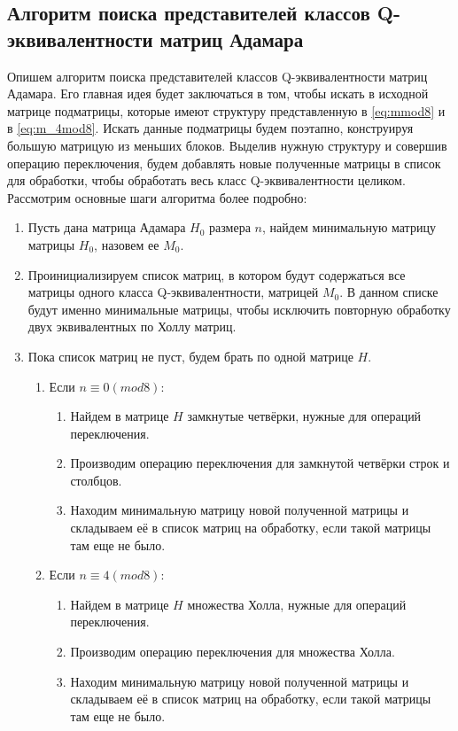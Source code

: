 \documentclass[a4paper, 14pt]{extreport}
\begin{document}
\subsection{Алгоритм поиска представителей классов Q-эквивалентности матриц Адамара}

Опишем алгоритм поиска представителей классов Q-эквивалентности матриц Адамара. Его главная идея будет заключаться в том, чтобы искать в исходной матрице подматрицы, которые имеют структуру представленную в \ref{eq:mmod8} и в \ref{eq:m_4mod8}. Искать данные подматрицы будем поэтапно, конструируя большую матрицую из меньших блоков. Выделив нужную структуру и совершив операцию переключения, будем добавлять новые полученные матрицы в список для обработки, чтобы обработать весь класс Q-эквивалентности целиком. Рассмотрим основные шаги алгоритма более подробно:
\begin{enumerate}
    \item Пусть дана матрица Адамара $H_0$ размера $n$, найдем минимальную матрицу матрицы $H_0$, назовем ее $M_0$.
    \item Проинициализируем список матриц, в котором будут содержаться все матрицы одного класса Q-эквивалентности, матрицей $M_0$. В данном списке будут именно минимальные матрицы, чтобы исключить повторную обработку двух эквивалентных по Холлу матриц.
    \item Пока список матриц не пуст, будем брать по одной матрице $H$.
    \begin{enumerate}[label*=\arabic*.]
        \item Если $n \equiv 0(mod8)$:
        \begin{enumerate}[label*=\arabic*.]
            \item Найдем в матрице $H$ замкнутые четвёрки, нужные для операций переключения.
            \item Производим операцию переключения для замкнутой четвёрки строк и столбцов.
            \item Находим минимальную матрицу новой полученной матрицы и складываем её в список матриц на обработку, если такой матрицы там еще не было.
        \end{enumerate}
        \item Если $n \equiv 4(mod8)$:
        \begin{enumerate}[label*=\arabic*.]
            \item Найдем в матрице $H$ множества Холла, нужные для операций переключения.
            \item Производим операцию переключения для множества Холла.
            \item Находим минимальную матрицу новой полученной матрицы и складываем её в список матриц на обработку, если такой матрицы там еще не было.
        \end{enumerate}
    \end{enumerate}
\end{enumerate}
\end{document}
